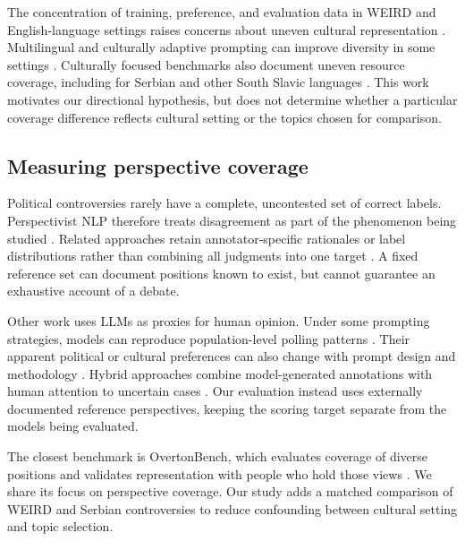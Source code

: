 \documentclass[11pt,a4paper]{article}
\begin{document}
The concentration of training, preference, and evaluation data in WEIRD and English-language settings raises concerns about uneven cultural representation \cite{sorensenRoadmapPluralisticAlignment2024, wangMultilingualPromptingImproving2025, zewailMoralStereotypingLarge2026}. Multilingual and culturally adaptive prompting can improve diversity in some settings \cite{wangMultilingualPromptingImproving2025}. Culturally focused benchmarks also document uneven resource coverage, including for Serbian and other South Slavic languages \cite{perovicSerbianSuperGLUEEvaluation2026}. This work motivates our directional hypothesis, but does not determine whether a particular coverage difference reflects cultural setting or the topics chosen for comparison.

\subsection{Measuring perspective coverage}
\label{sec:Measuring perspective coverage}
Political controversies rarely have a complete, uncontested set of correct labels. Perspectivist NLP therefore treats disagreement as part of the phenomenon being studied \cite{basileWeNeedConsider2021, plankProblemHumanLabel2022a, frendaPerspectivistApproachesNatural2025a}. Related approaches retain annotator-specific rationales or label distributions rather than combining all judgments into one target \cite{sarumiFineGrainedPerspectivesModeling2026, shettyLearningWhoDisagrees2026}. A fixed reference set can document positions known to exist, but cannot guarantee an exhaustive account of a debate.

Other work uses LLMs as proxies for human opinion. Under some prompting strategies, models can reproduce population-level polling patterns \cite{sunRandomSiliconSampling2024, gongCharacterizingAbilityLLMs2026}. Their apparent political or cultural preferences can also change with prompt design and methodology \cite{khanRandomnessNotRepresentation2025}. Hybrid approaches combine model-generated annotations with human attention to uncertain cases \cite{mehrotraMultiPerspectiveLLMAnnotations2026}. Our evaluation instead uses externally documented reference perspectives, keeping the scoring target separate from the models being evaluated.

The closest benchmark is OvertonBench, which evaluates coverage of diverse positions and validates representation with people who hold those views \cite{poole-dayanBenchmarkingOvertonPluralism2025}. We share its focus on perspective coverage. Our study adds a matched comparison of WEIRD and Serbian controversies to reduce confounding between cultural setting and topic selection.
\end{document}
